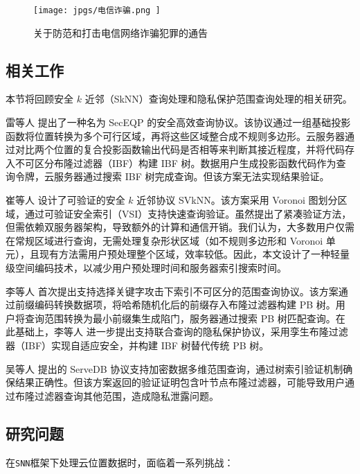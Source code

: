 \documentclass{cumcmthesis}
\numberwithin{equation}{section} %
\numberwithin{figure}{section} %
\numberwithin{table}{section} %
\begin{document}
\begin{figure}[h]
	\centering
	\texttt{[image:  jpgs/电信诈骗.png ]}
	\caption{ 关于防范和打击电信网络诈骗犯罪的通告 }
	\label{关于防范和打击电信网络诈骗犯罪的通告}
\end{figure}

\subsection{相关工作}
本节将回顾安全 \(k\) 近邻（SkNN）查询处理和隐私保护范围查询处理的相关研究。

\textbf{\bfseries{}}

雷等人 \cite{18} 提出了一种名为 SecEQP 的安全高效查询协议。该协议通过一组基础投影函数将位置转换为多个可行区域，再将这些区域整合成不规则多边形。云服务器通过对比两个位置的复合投影函数输出代码是否相等来判断其接近程度，并将代码存入不可区分布隆过滤器（IBF）构建 IBF 树。数据用户生成投影函数代码作为查询令牌，云服务器通过搜索 IBF 树完成查询。但该方案无法实现结果验证。

崔等人 \cite{19} 设计了可验证的安全 \(k\) 近邻协议 SVkNN。该方案采用 Voronoi 图划分区域，通过可验证安全索引（VSI）支持快速查询验证。虽然提出了紧凑验证方法，但需依赖双服务器架构，导致额外的计算和通信开销。我们认为，大多数用户仅需在常规区域进行查询，无需处理复杂形状区域（如不规则多边形和 Voronoi 单元），且现有方法需用户预处理整个区域，效率较低。因此，本文设计了一种轻量级空间编码技术，以减少用户预处理时间和服务器索引搜索时间。

\textbf{\bfseries{}}

李等人 \cite{20} 首次提出支持选择关键字攻击下索引不可区分的范围查询协议。该方案通过前缀编码转换数据项，将哈希随机化后的前缀存入布隆过滤器构建 PB 树。用户将查询范围转换为最小前缀集生成陷门，服务器通过搜索 PB 树匹配查询。在此基础上，李等人 \cite{21} 进一步提出支持联合查询的隐私保护协议，采用孪生布隆过滤器（IBF）实现自适应安全，并构建 IBF 树替代传统 PB 树。

吴等人 \cite{22} 提出的 ServeDB 协议支持加密数据多维范围查询，通过树索引验证机制确保结果正确性。但该方案返回的验证证明包含叶节点布隆过滤器，可能导致用户通过布隆过滤器查询其他范围，造成隐私泄露问题。

\subsection{研究问题}

在\texttt{SNN}框架下处理云位置数据时，面临着一系列挑战：
\end{document}
